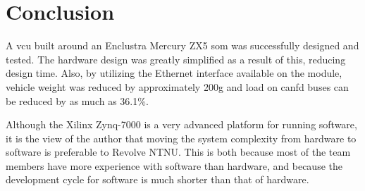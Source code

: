 \section{Conclusion}


A \acrlong{vcu} built around an Enclustra Mercury ZX5 \acrlong{som} was successfully designed and tested. The hardware design was greatly simplified as a result of this, reducing design time. Also, by utilizing the Ethernet interface available on the module, vehicle weight was reduced by approximately 200\si{\gram} and load on \acrshort{canfd} buses can be reduced by as much as 36.1\%.

Although the Xilinx Zynq-7000 is a very advanced platform for running software, it is the view of the author that moving the system complexity from hardware to software is preferable to Revolve NTNU. This is both because most of the team members have more experience with software than hardware, and because the development cycle for software is much shorter than that of hardware.


